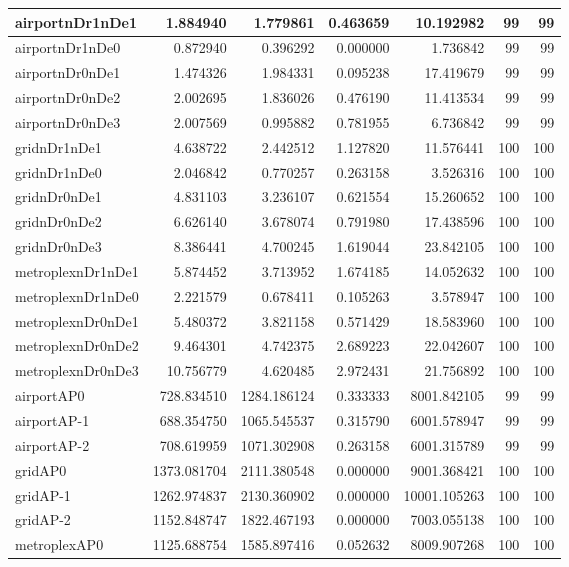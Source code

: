 \begin{longtable}{|l|r|r|r|r|r|r|}
\endlastfoot
airportnDr1nDe1 & 1.884940 & 1.779861 & 0.463659 & 10.192982 & 99 & 99 \\ \hline
airportnDr1nDe0 & 0.872940 & 0.396292 & 0.000000 & 1.736842 & 99 & 99 \\ \hline
airportnDr0nDe1 & 1.474326 & 1.984331 & 0.095238 & 17.419679 & 99 & 99 \\ \hline
airportnDr0nDe2 & 2.002695 & 1.836026 & 0.476190 & 11.413534 & 99 & 99 \\ \hline
airportnDr0nDe3 & 2.007569 & 0.995882 & 0.781955 & 6.736842 & 99 & 99 \\ \hline
gridnDr1nDe1 & 4.638722 & 2.442512 & 1.127820 & 11.576441 & 100 & 100 \\ \hline
gridnDr1nDe0 & 2.046842 & 0.770257 & 0.263158 & 3.526316 & 100 & 100 \\ \hline
gridnDr0nDe1 & 4.831103 & 3.236107 & 0.621554 & 15.260652 & 100 & 100 \\ \hline
gridnDr0nDe2 & 6.626140 & 3.678074 & 0.791980 & 17.438596 & 100 & 100 \\ \hline
gridnDr0nDe3 & 8.386441 & 4.700245 & 1.619044 & 23.842105 & 100 & 100 \\ \hline
metroplexnDr1nDe1 & 5.874452 & 3.713952 & 1.674185 & 14.052632 & 100 & 100 \\ \hline
metroplexnDr1nDe0 & 2.221579 & 0.678411 & 0.105263 & 3.578947 & 100 & 100 \\ \hline
metroplexnDr0nDe1 & 5.480372 & 3.821158 & 0.571429 & 18.583960 & 100 & 100 \\ \hline
metroplexnDr0nDe2 & 9.464301 & 4.742375 & 2.689223 & 22.042607 & 100 & 100 \\ \hline
metroplexnDr0nDe3 & 10.756779 & 4.620485 & 2.972431 & 21.756892 & 100 & 100 \\ \hline
airportAP0 & 728.834510 & 1284.186124 & 0.333333 & 8001.842105 & 99 & 99 \\ \hline
airportAP-1 & 688.354750 & 1065.545537 & 0.315790 & 6001.578947 & 99 & 99 \\ \hline
airportAP-2 & 708.619959 & 1071.302908 & 0.263158 & 6001.315789 & 99 & 99 \\ \hline
gridAP0 & 1373.081704 & 2111.380548 & 0.000000 & 9001.368421 & 100 & 100 \\ \hline
gridAP-1 & 1262.974837 & 2130.360902 & 0.000000 & 10001.105263 & 100 & 100 \\ \hline
gridAP-2 & 1152.848747 & 1822.467193 & 0.000000 & 7003.055138 & 100 & 100 \\ \hline
metroplexAP0 & 1125.688754 & 1585.897416 & 0.052632 & 8009.907268 & 100 & 100 \\ \hline

\end{longtable}
